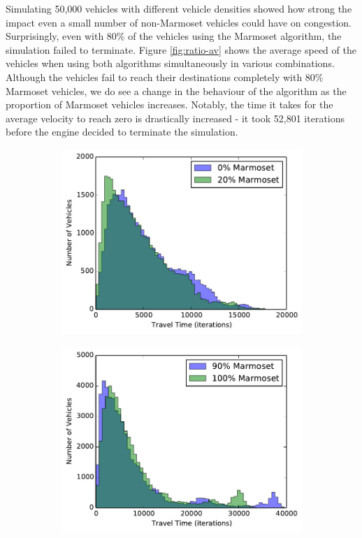 \documentclass[ %
                    author={Alexander Hill},
                supervisor={Dr. Benjamin Sach},
                    degree={MEng},
                     title={MARMOSET},
                  subtitle={Multi-Agent Route Management using Online Simulation for Efficient Transportation},
                      type={research},
                      year={2016} ]{dissertation}
\begin{document}
Simulating 50,000 vehicles with different vehicle densities showed how strong
the impact even a small number of non-Marmoset vehicles could have on
congestion. Surprisingly, even with 80\% of the vehicles using the Marmoset
algorithm, the simulation failed to terminate. Figure \ref{fig:ratio-av} shows
the average speed of the vehicles when using both algorithms simultaneously in
various combinations. Although the vehicles fail to reach their destinations
completely with 80\% Marmoset vehicles, we do see a change in the behaviour of
the algorithm as the proportion of Marmoset vehicles increases. Notably, the
time it takes for the average velocity to reach zero is drastically increased -
it took 52,801 iterations before the engine decided to terminate the simulation.

\begin{figure}[h]
    \centering
    \begin{subfigure}[b]{0.45\textwidth}
        \centering
        \includegraphics[width=\textwidth]{0-20-hist}
        \caption{}\label{fig:0-20-hist}
    \end{subfigure}
    \hfill
    \begin{subfigure}[b]{0.45\textwidth}
        \centering
        \includegraphics[width=\textwidth]{90-100-hist}

\end{subfigure}
\end{figure}
\end{document}
